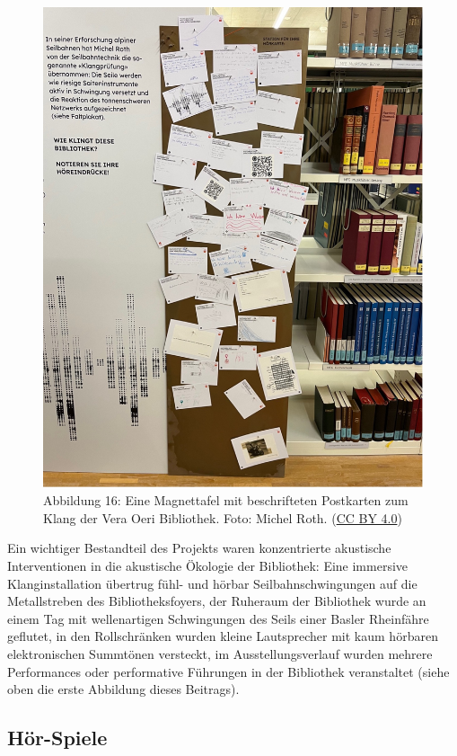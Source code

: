 \documentclass[a4paper,
fontsize=11pt,
oneside,
numbers=noperiodatend,
parskip=half-,
bibliography=totoc,
final
]{scrartcl}
\begin{document}
\begin{figure}
\centering
\includegraphics{img/Abb16.jpg}
\caption{Abbildung 16: Eine Magnettafel mit beschrifteten Postkarten zum
Klang der Vera Oeri Bibliothek. Foto: Michel Roth. (\href{https://creativecommons.org/licenses/by/4.0/}{CC BY 4.0})}
\end{figure}

Ein wichtiger Bestandteil des Projekts waren konzentrierte akustische
Interventionen in die akustische Ökologie der Bibliothek: Eine immersive
Klanginstallation übertrug fühl- und hörbar Seilbahnschwingungen auf die
Metallstreben des Bibliotheksfoyers, der Ruheraum der Bibliothek wurde
an einem Tag mit wellenartigen Schwingungen des Seils einer Basler
Rheinfähre geflutet, in den Rollschränken wurden kleine Lautsprecher mit
kaum hörbaren elektronischen Summtönen versteckt, im Ausstellungsverlauf
wurden mehrere Performances oder performative Führungen in der
Bibliothek veranstaltet (siehe oben die erste Abbildung dieses
Beitrags).

\hypertarget{huxf6r-spiele}{%
\subsection{Hör-Spiele}\label{huxf6r-spiele}}
\end{document}
